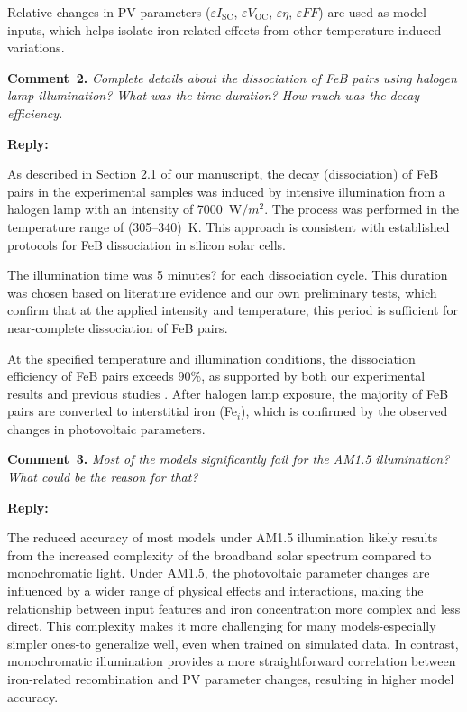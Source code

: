 \documentclass[a4paper,fleqn]{cas-sc}
\begin{document}
Relative changes in PV parameters ($\varepsilon I_\mathrm{SC}$, $\varepsilon V_\mathrm{OC}$, $\varepsilon \eta$, $\varepsilon FF$) are used as model inputs, which helps isolate iron-related effects from other temperature-induced variations.

\vspace{1cm}
\noindent
\textcolor[rgb]{0.00,0.50,1.00}{\textbf{Comment~2.}}
\emph{Complete details about the dissociation of FeB pairs using halogen lamp illumination? What was the time duration? How much was the decay efficiency.}

\noindent
\textcolor[rgb]{0.51,0.00,0.00}{\textbf{Reply:}}

As described in Section 2.1 of our manuscript, the decay (dissociation) of FeB pairs in the experimental samples was induced by intensive illumination from a halogen lamp with an intensity of 7000~W/$m^2$. 
The process was performed in the temperature range of (305–340)~K. 
This approach is consistent with established protocols for FeB dissociation in silicon solar cells.


The illumination time was 5 minutes? for each dissociation cycle. 
This duration was chosen based on literature evidence and our own preliminary tests, which confirm that at the applied intensity and temperature, this period is sufficient for near-complete dissociation of FeB pairs.


At the specified temperature and illumination conditions, the dissociation efficiency of FeB pairs exceeds 90\%, as supported by both our experimental results and previous studies \cite{geerligs2004}. 
After halogen lamp exposure, the majority of FeB pairs are converted to interstitial iron (Fe$_i$), which is confirmed by the observed changes in photovoltaic parameters.



\vspace{1cm}
\noindent
\textcolor[rgb]{0.00,0.50,1.00}{\textbf{Comment~3.}}
\emph{Most of the models significantly fail for the AM1.5 illumination? What could be the reason for that?}

\noindent
\textcolor[rgb]{0.51,0.00,0.00}{\textbf{Reply:}}

The reduced accuracy of most models under AM1.5 illumination likely results from the increased complexity of the broadband solar spectrum compared to monochromatic light. 
Under AM1.5, the photovoltaic parameter changes are influenced by a wider range of physical effects and interactions, making the relationship between input features and iron concentration more complex and less direct. 
This complexity makes it more challenging for many models-especially simpler ones-to generalize well, even when trained on simulated data. 
In contrast, monochromatic illumination provides a more straightforward correlation between iron-related recombination and PV parameter changes, resulting in higher model accuracy.
\end{document}
